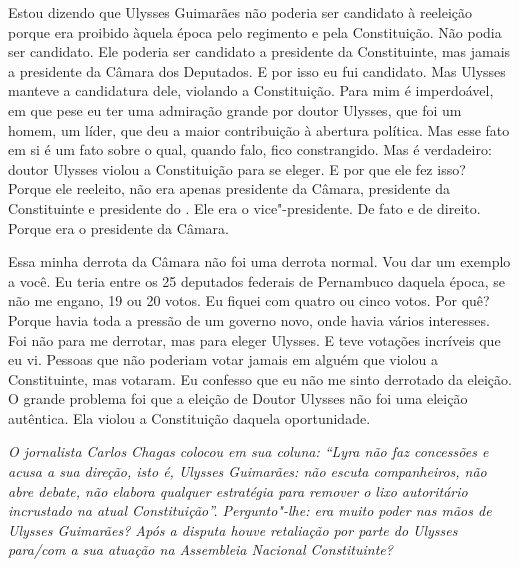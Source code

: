Estou dizendo que Ulysses Guimarães não poderia ser candidato à
reeleição porque era proibido àquela época pelo regimento e pela
Constituição. Não podia ser candidato. Ele poderia ser candidato a
presidente da Constituinte, mas jamais a presidente da Câmara dos
Deputados. E por isso eu fui candidato. Mas Ulysses manteve a
candidatura dele, violando a Constituição. Para mim é imperdoável, em
que pese eu ter uma admiração grande por doutor Ulysses, que foi um
homem, um líder, que deu a maior contribuição à abertura política. Mas
esse fato em si é um fato sobre o qual, quando falo, fico constrangido.
Mas é verdadeiro: doutor Ulysses violou a Constituição para se eleger. E
por que ele fez isso? Porque ele reeleito, não era apenas presidente da
Câmara, presidente da Constituinte e presidente do . Ele era o
vice"-presidente. De fato e de direito. Porque era o presidente da
Câmara.

Essa minha derrota da Câmara não foi uma derrota normal. Vou dar um
exemplo a você. Eu teria entre os 25 deputados federais de Pernambuco
daquela época, se não me engano, 19 ou 20 votos. Eu fiquei com quatro ou
cinco votos. Por quê? Porque havia toda a pressão de um governo novo,
onde havia vários interesses. Foi não para me derrotar, mas para eleger
Ulysses. E teve votações incríveis que eu vi. Pessoas que não poderiam
votar jamais em alguém que violou a Constituinte, mas votaram. Eu
confesso que eu não me sinto derrotado da eleição. O grande problema foi
que a eleição de Doutor Ulysses não foi uma eleição autêntica. Ela
violou a Constituição daquela oportunidade.

\medskip

\emph{O jornalista Carlos Chagas colocou em sua coluna: ``Lyra não faz
concessões e acusa a sua direção, isto é, Ulysses Guimarães: não escuta
companheiros, não abre debate, não elabora qualquer estratégia para
remover o lixo autoritário incrustado na atual Constituição''.
Pergunto"-lhe: era muito poder nas mãos de Ulysses Guimarães? Após a
disputa houve retaliação por parte do Ulysses para/com a sua atuação na
Assembleia Nacional Constituinte?}


